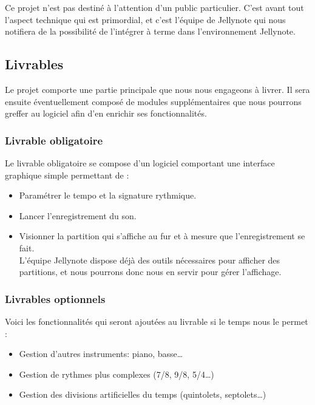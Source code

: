 \documentclass[12pt]{article}
\begin{document}
Ce projet n’est pas destiné à l’attention d’un public particulier. C’est avant tout l’aspect technique qui est primordial, et c’est l’équipe de Jellynote qui nous notifiera de la possibilité de l’intégrer à terme dans l’environnement Jellynote.\\

\newpage
\subsection{Livrables}
Le projet comporte une partie principale que nous nous engageons à livrer. Il sera ensuite éventuellement composé de modules supplémentaires que nous pourrons greffer au logiciel afin d’en enrichir ses fonctionnalités.\\

\subsubsection{Livrable obligatoire}

Le livrable obligatoire se compose d’un logiciel comportant une interface graphique simple permettant de :\\
\begin{itemize}
\item Paramétrer le tempo et la signature rythmique.
\item Lancer l'enregistrement du son.
\item Visionner la partition qui s'affiche au fur et à mesure que l'enregistrement se fait.\\
L’équipe Jellynote dispose déjà des outils nécessaires pour afficher des partitions, et nous pourrons donc nous en servir pour gérer l'affichage.
\end{itemize}

\subsubsection{Livrables optionnels}

Voici les fonctionnalités qui seront ajoutées au livrable si le temps nous le permet :
\begin{itemize}
\item Gestion d’autres instruments: piano, basse…
\item Gestion de rythmes plus complexes (7/8, 9/8, 5/4…)
\item Gestion des divisions artificielles du temps (quintolets, septolets…)
\end{itemize}
\end{document}
